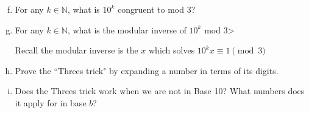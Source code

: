 \documentclass[12pt,letterpaper]{article}
\newcommand\N{\mathbb N}
\begin{document}
		\begin{enumerate}[a.]
							\setcounter{enumi}{5}
			\item For any $k \in \N$, what is $10^k$ congruent to mod 3?

			\begin{mdframed}
			\vspace{1cm}
			\end{mdframed}

			\item For any $k \in \N$, what is the modular inverse of $10^k$ mod 3>

			Recall the modular inverse is the $x$ which solves $10^k x\equiv 1 \pmod 3$

			\begin{mdframed}
			\vspace{1cm}
			\end{mdframed}

			\item Prove the ``Threes trick" by expanding a number in terms of its digits.


			\begin{mdframed}
			\vspace{5.5cm}
			\end{mdframed}



			\item Does the Threes trick work when we are not in Base 10? What numbers does it apply for in base $b$?
			

			\begin{mdframed}
			\vspace{5.5cm}
			\end{mdframed}
			
		\end{enumerate}

		

	
	
\end{document}
